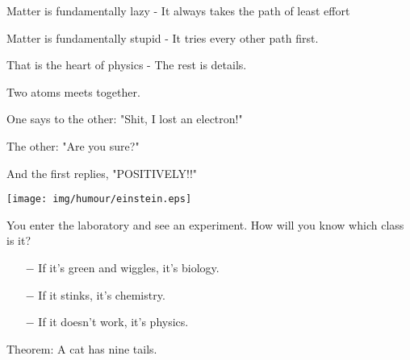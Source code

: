 	\begin{center}\underline{\hspace{5 cm}}\end{center}

	Matter is fundamentally lazy - It always takes the path of least effort
	
	Matter is fundamentally stupid - It tries every other path first.
	
	That is the heart of physics - The rest is details.
	
	\begin{center}\underline{\hspace{5 cm}}\end{center}
	
	Two atoms meets together. 
	
	One says to the other: "Shit, I lost an electron!"
	
	The other: "Are you sure?"
	
	And the first replies, "POSITIVELY!!"
	
	\begin{center}\underline{\hspace{5 cm}}\end{center}

	\begin{center}
	\texttt{[image: img/humour/einstein.eps]}
	\end{center}
	
	\begin{center}\underline{\hspace{5 cm}}\end{center}	
	
	You enter the laboratory and see an experiment. How will you know which class is it?
	
	\begin{itemize}	 
		\item[$-$] If it's green and wiggles, it's biology.
	
		\item[$-$] If it stinks, it's chemistry.
	
		\item[$-$] If it doesn't work, it's physics.
	\end{itemize}
	
	\begin{center}\underline{\hspace{5 cm}}\end{center}	

	Theorem: A cat has nine tails.
	
